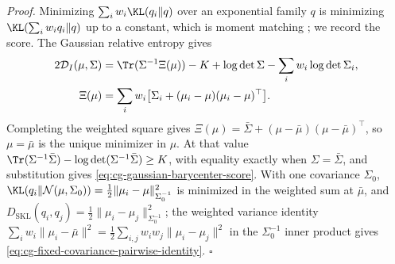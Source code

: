 \noindent\emph{Proof.}
Minimizing \(\sum_iw_i\KL(q_i\Vert q)\) over an exponential family \(q\) is
minimizing \(\KL(\sum_iw_iq_i\Vert q)\) up to a constant, which is moment
matching \citep[Sec.~10.7, Eqs.~(10.184)--(10.187)]{Bishop2006}; we record the
score. The Gaussian relative entropy gives
\begin{equation}
\begin{aligned}
2\mathcal D_I(\mu,\Sigma)
&=\Tr(\Sigma^{-1}\Xi(\mu))-K+\log\det\Sigma
-\sum_i w_i\log\det\Sigma_i,\\
\Xi(\mu)&=\sum_i w_i\bigl[\Sigma_i+(\mu_i-\mu)(\mu_i-\mu)^\top\bigr].
\end{aligned}
\label{eq:cg-gaussian-barycenter-expansion}
\end{equation}
Completing the weighted square gives
\(\Xi(\mu)=\bar\Sigma+(\mu-\bar\mu)(\mu-\bar\mu)^\top\), so \(\mu=\bar\mu\) is
the unique minimizer in \(\mu\). At that value
\(\Tr(\Sigma^{-1}\bar\Sigma)-\log\det(\Sigma^{-1}\bar\Sigma)\geq K\), with
equality exactly when \(\Sigma=\bar\Sigma\), and substitution gives
\eqref{eq:cg-gaussian-barycenter-score}. With one covariance \(\Sigma_0\),
\(\KL(q_i\Vert\mathcal N(\mu,\Sigma_0))=\frac12\|\mu_i-\mu\|^2_{\Sigma_0^{-1}}\)
is minimized in the weighted sum at \(\bar\mu\), and
\(D_{\mathrm{SKL}}(q_i,q_j)=\frac12\|\mu_i-\mu_j\|^2_{\Sigma_0^{-1}}\); the
weighted variance identity
\(\sum_iw_i\|\mu_i-\bar\mu\|^2=\frac12\sum_{i,j}w_iw_j\|\mu_i-\mu_j\|^2\) in the
\(\Sigma_0^{-1}\) inner product gives
\eqref{eq:cg-fixed-covariance-pairwise-identity}. \(\square\)

